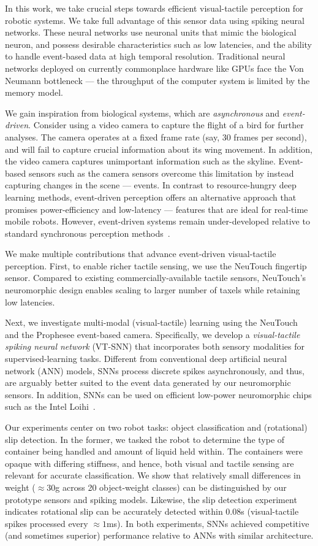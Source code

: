 \documentclass[fyp]{socreport}
\begin{document}
In this work, we take crucial steps towards efficient visual-tactile perception
for robotic systems. We take full advantage of this sensor data using spiking
neural networks. These neural networks use neuronal units that mimic the
biological neuron, and possess desirable characteristics such as low latencies,
and the ability to handle event-based data at high temporal resolution.
Traditional neural networks deployed on currently commonplace hardware like GPUs
face the Von Neumann bottleneck --- the throughput of the computer system is
limited by the memory model.

We gain inspiration from biological systems, which are \emph{asynchronous} and
\emph{event-driven}. Consider using a video camera to capture the flight of a
bird for further analyses. The camera operates at a fixed frame rate (say, 30
frames per second), and will fail to capture crucial information about its wing
movement. In addition, the video camera captures unimportant information such as
the skyline. Event-based sensors such as the camera sensors overcome this
limitation by instead capturing changes in the scene --- events. In contrast to
resource-hungry deep learning methods, event-driven perception offers an
alternative approach that promises power-efficiency and low-latency --- features
that are ideal for real-time mobile robots. However, event-driven systems remain
under-developed relative to standard synchronous perception
methods~\cite{pfeiffer2018deep}.

We make multiple contributions that advance event-driven visual-tactile
perception. First, to enable richer tactile sensing, we use the NeuTouch
fingertip sensor. Compared to existing commercially-available tactile sensors,
NeuTouch's neuromorphic design enables scaling to larger number of taxels while
retaining low latencies.

Next, we investigate multi-modal (visual-tactile) learning using the NeuTouch
and the Prophesee event-based camera. Specifically, we develop a
\emph{visual-tactile spiking neural network} (VT-SNN) that incorporates both
sensory modalities for supervised-learning tasks. Different from conventional
deep artificial neural network (ANN) models, SNNs process discrete spikes
asynchronously, and thus, are arguably better suited to the event data generated
by our neuromorphic sensors. In addition, SNNs can be used on efficient
low-power neuromorphic chips such as the Intel Loihi~\cite{davies2018loihi}.

Our experiments center on two robot tasks: object classification and
(rotational) slip detection. In the former, we tasked the robot to determine the
type of container being handled and amount of liquid held within. The containers
were opaque with differing stiffness, and hence, both visual and tactile sensing
are relevant for accurate classification. We show that relatively small
differences in weight ($\approx 30$g across 20 object-weight classes) can be
distinguished by our prototype sensors and spiking models. Likewise, the slip
detection experiment indicates rotational slip can be accurately detected within
$0.08$s (visual-tactile spikes processed every $\approx 1$ms). In both
experiments, SNNs achieved competitive (and sometimes superior) performance
relative to ANNs with similar architecture.
\end{document}
